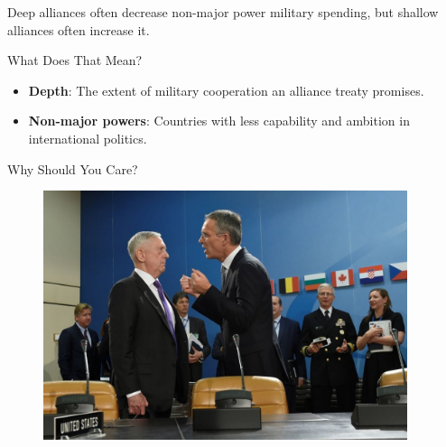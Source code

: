 \documentclass[12pt]{beamer}
\begin{document}
 \begin{frame}[standout]

Deep alliances often decrease non-major power military spending, but shallow alliances often increase it.   

 \end{frame}
 
 
 \begin{frame}{What Does That Mean?} 

\begin{itemize}
\item \textbf{Depth}: The extent of military cooperation an alliance treaty promises.
\pause 
\item \textbf{Non-major powers}: Countries with less capability and ambition in international politics. 
\end{itemize}

 \end{frame}
 
 
 

\begin{frame}{Why Should You Care?}

\begin{figure}[htbp]
	\centering
		\includegraphics[width=0.95\textwidth]{mattis-nato.jpg}
	\label{fig:mattis-nato}
\end{figure}


\end{frame}


\end{document}
